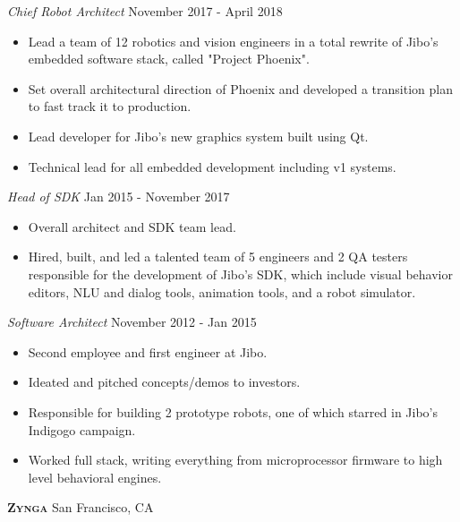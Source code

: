 \documentclass[a4paper]{article}
\begin{document}
\begin{addmargin}[1em]{0em}
\begin{itemize}
    \end{itemize}
    \textit{Chief Robot Architect} \hfill November 2017 - April 2018\\
    \vspace{-1mm}
    \begin{itemize} \itemsep 1pt
        \item Lead a team of 12 robotics and vision engineers in a total rewrite of 
            Jibo's embedded software stack, called "Project Phoenix".
        \item Set overall architectural direction of Phoenix and developed
            a transition plan to fast track it to production.
        \item Lead developer for Jibo's new graphics system built using Qt.
        \item Technical lead for all embedded development including v1 systems.
    \end{itemize}
    \textit{Head of SDK} \hfill Jan 2015 - November 2017\\
    \vspace{-1mm}
    \begin{itemize} \itemsep 1pt
        \item Overall architect and SDK team lead.
        \item Hired, built, and led a talented team of 5 engineers and 2 QA testers 
            responsible for the development of Jibo’s SDK, which include visual behavior 
            editors, NLU and dialog tools, animation tools, and a robot simulator.
    \end{itemize}
    \textit{Software Architect} \hfill November 2012 - Jan 2015\\
    \vspace{-1mm}
    \begin{itemize} \itemsep 1pt
        \item Second employee and first engineer at Jibo.
        \item Ideated and pitched concepts/demos to investors.
        \item Responsible for building 2 prototype robots, one of which starred in Jibo's
            Indigogo campaign.
        \item Worked full stack, writing everything from microprocessor firmware to 
            high level behavioral engines.
    \end{itemize}
\end{addmargin}

\textbf{\textsc{Zynga}} \hfill San Francisco, CA\\
\vspace{2mm}
\end{document}
